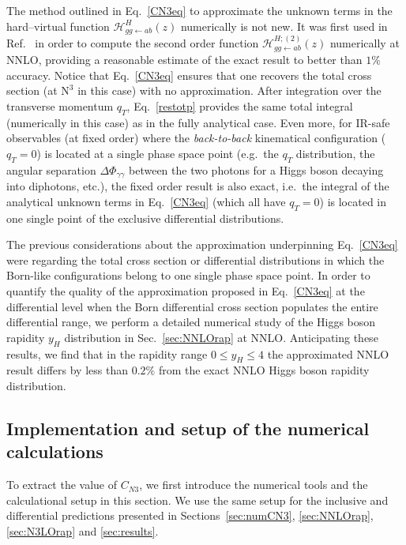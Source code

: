 \documentclass[12pt]{article}
\DeclareRobustCommand{\qt}{\ensuremath{q_T}\xspace}
\DeclareRobustCommand{\cH}{\ensuremath{\mathcal{H}}}
\DeclareRobustCommand{\LO}{\text{LO}\xspace}
\DeclareRobustCommand{\N}[1]{\ensuremath{\text{N}^{#1}}} %
\begin{document}
The method outlined in Eq.~\eqref{CN3eq} to approximate the unknown terms in the hard--virtual function $\cH^H_{gg\gets ab}(z)$ numerically is not new. It was first used in Ref.~\cite{Bozzi:2005wk} in order to compute the second order function $\cH^{H;(2)}_{gg\gets ab}(z)$ numerically at NNLO, providing a reasonable estimate of the exact result to better than $1\%$ accuracy. Notice that Eq.~\eqref{CN3eq} ensures that one recovers the total cross section (at \N3\LO in this case) with no approximation. After integration over the transverse momentum $\qt$, Eq.~\eqref{restotp} provides the same total integral (numerically in this case)  as in the fully analytical case. Even more, for IR-safe observables (at fixed order) where the \textit{back-to-back} kinematical configuration ($\qt=0$) is located at a single phase space point (e.g.\ the $\qt$ distribution, the angular separation $\Delta \Phi _{\gamma\gamma}$ between the two photons for a Higgs boson decaying into diphotons, etc.), the fixed order result is also exact, i.e.\ the integral of the analytical unknown terms in Eq.~\eqref{CN3eq} (which all have $\qt=0$) is located in one single point of the exclusive differential distributions. 

The previous considerations about the approximation underpinning Eq.~\eqref{CN3eq} were regarding the total cross section or differential distributions in which the Born-like configurations belong to one single phase space point.
In order to quantify the quality of the approximation proposed in Eq.~\eqref{CN3eq} at the differential level when the Born differential cross section populates the entire differential range, we perform a detailed numerical study of the Higgs boson rapidity $y_{H}$ distribution in Sec.~\ref{sec:NNLOrap} at NNLO. Anticipating these results,  we find that in the rapidity range $0\leq y_{H}\leq 4$ the approximated NNLO result differs by less than $0.2\%$ from the exact NNLO Higgs boson rapidity distribution.

\subsection{Implementation and setup of the numerical calculations}
\label{sec:numsetup}
To extract the value of $C_{N3}$, we first introduce the numerical tools and the calculational setup in this section. We use the same setup for the inclusive and differential predictions presented in Sections~\ref{sec:numCN3}, \ref{sec:NNLOrap}, \ref{sec:N3LOrap} and \ref{sec:results}.
\end{document}

